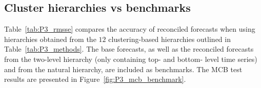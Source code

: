 \documentclass[a4paper,review,12pt,authoryear]{elsarticle}
\begin{document}




\subsection{Cluster hierarchies vs benchmarks}
\label{subsec:cluster_vs_benchmarks}


 
Table~\ref{tab:P3_rmsse} compares the accuracy of reconciled forecasts when using hierarchies obtained from the $12$ clustering-based hierarchies outlined in Table~\ref{tab:P3_methods}. The base forecasts, as well as the reconciled forecasts from the two-level hierarchy (only containing top- and bottom- level time series) and from the natural hierarchy, are included as benchmarks.
The MCB test results are presented in Figure~\ref{fig:P3_mcb_benchmark}.
\end{document}
